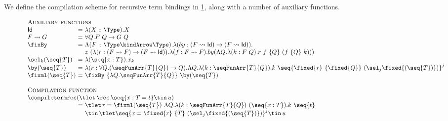 \newcommand{\selnk}[2]{\sel_{#2}^{#1}}
\newcommand{\selk}[1]{\sel_{#1}}

We define the compilation scheme for recursive term bindings in
\cref{fig:compile-recursive-terms}, along with a number of auxiliary
functions.

\newcommand{\natT}[2]{#1 \rightsquigarrow #2}

\begin{figure}[!t]
  \centering
  \begin{displaymath}
  \begin{array}{l@{\ }l@{\ }l}
  \multicolumn{3}{l}{\textsc{Auxiliary functions}}\\
  \textsf{Id} &=& \lambda (X :: \Type) . X \\
  \natT{F}{G} &=& \forall Q . F\ Q \rightarrow G\ Q\\
  \fixBy &=& \Lambda (F :: \Type \kindArrow \Type) . 
  \lambda (by : (\natT{F}{\textsf{Id}}) \rightarrow (\natT{F}{\textsf{Id}})) . \\
  &&z\ (\lambda (r : (\natT{F}{F}) \rightarrow (\natT{F}{\textsf{Id}})) . 
  \lambda (f : \natT{F}{F}) . 
  by (
  \Lambda Q . 
  \lambda (k : F\ Q) . 
  r\ f\ \{ Q \}\ (f\ \{ Q \}\ k)))\\

  \selk{k}(\seq{T}) &=& \lambda (\seq{x:T}) . x_k\\

  \by(\seq{T}) &=& \lambda (r : \forall Q . (\seqFunArr{T}{Q}) \rightarrow Q) . \Lambda Q. 
  \lambda (k : \seqFunArr{T}{Q}).
  k\ \seq{\fixed{r}\ \{ \fixed{Q} \}\ (\selk{j} \fixed{(\seq{T})})}^j\\

  \fixml(\seq{T}) &=& \fixBy\ \{ \lambda Q . \seqFunArr{T}{Q} \}\ \by(\seq{T})\\
  \\
  \multicolumn{3}{l}{\textsc{Compilation function}}\\
  \multicolumn{3}{l}{\compiletermrec(\tlet\, \rec\, \seq{x : T = t} \tin\, u)}\\
  &=&\tlet\, r = \fixml(\seq{T})\ \Lambda Q . \lambda (k: \seqFunArr{T}{Q} )\ (\seq{x:T}) . k\ \seq{t} \\
  &&\tin\, \tlet \seq{x = \fixed{r}\ \{ T \}\ (\selk{j} \fixed{(\seq{T})})}^j \tin\, u
  \end{array}
  \end{displaymath}

  \label{fig:compile-recursive-terms}
\end{figure}


